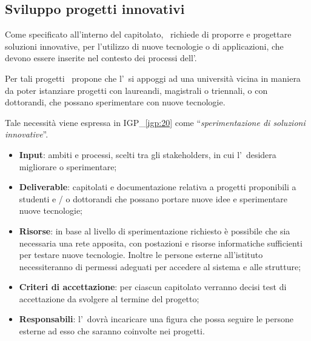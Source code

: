 	\subsection{Sviluppo progetti innovativi}
	
		Come specificato all'interno del capitolato, \istituto~richiede di proporre e progettare soluzioni innovative, per l’utilizzo di nuove tecnologie o di applicazioni, che devono essere inserite nel contesto dei processi dell'\istituto.
		
		Per tali progetti \azienda~propone che l'\istituto~si appoggi ad una università vicina in maniera da poter istanziare progetti con laureandi, magistrali o triennali, o con dottorandi, che possano sperimentare con nuove tecnologie.
		
		Tale necessità viene espressa in {\color{pantone}IGP\_\ref{igp:20}} come ``\textit{sperimentazione di soluzioni innovative}''.
		
	
		\begin{itemize}[noitemsep]
			\renewcommand\labelitemi{--}
			\item \textbf{Input}: ambiti e processi, scelti tra gli stakeholders, in cui l'\istituto~desidera migliorare o sperimentare;
			\item \textbf{Deliverable}: capitolati e documentazione relativa a progetti proponibili a studenti e / o dottorandi che possano portare nuove idee e sperimentare nuove tecnologie;
			\item \textbf{Risorse}: in base al livello di sperimentazione richiesto è possibile che sia necessaria una rete apposita, con postazioni e risorse informatiche sufficienti per testare nuove tecnologie.
			Inoltre le persone esterne all'istituto necessiteranno di permessi adeguati per accedere al sistema e alle strutture;
			\item \textbf{Criteri di accettazione}: per ciascun capitolato verranno decisi test di accettazione da svolgere al termine del progetto;
			\item \textbf{Responsabili}: l'\istituto~dovrà incaricare una figura che possa seguire le persone esterne ad esso che saranno coinvolte nei progetti.
		\end{itemize}
		
